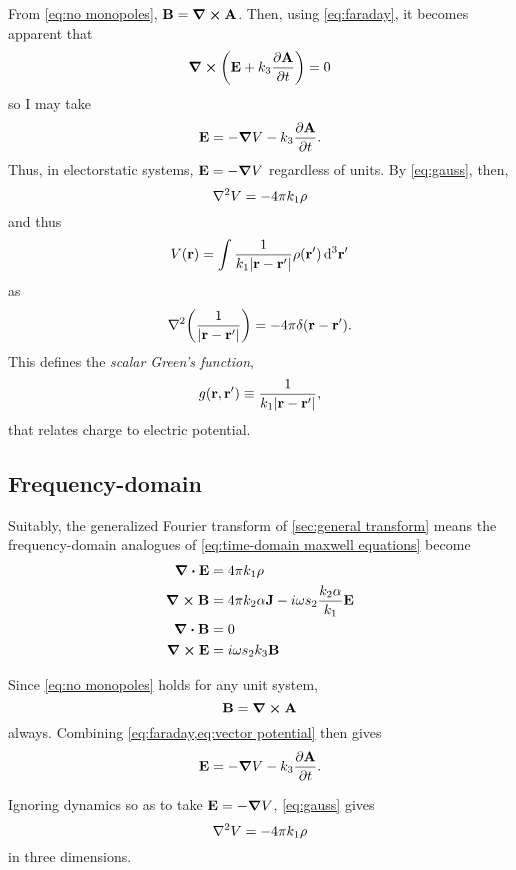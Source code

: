 From \cref{eq:no monopoles}, $\vb{B} = \curl{\vb{A}}$. 
Then, using \cref{eq:faraday}, it becomes apparent that
\begin{equation*}
  \curl{\qty(\vb{E} + k_3 \pdv{\vb{A}}{t})} = 0
\end{equation*}
so I may take
\begin{equation*}
  \vb{E} = -\grad{V} - k_3 \pdv{\vb{A}}{t}.
\end{equation*}
Thus, in electorstatic systems, $\vb{E} = -\grad{V}$ regardless of units.
By \cref{eq:gauss}, then,
\begin{equation*}
  \laplacian V = -4 \pi k_1 \rho
\end{equation*}
and thus
\begin{equation*}
  V(\vb{r}) = \int \frac{1}{k_1 \abs{\vb{r} - \vb{r}'}} \rho(\vb{r}') \dd[3]{\vb{r}'}
\end{equation*}
as
\begin{equation*}
  \laplacian \qty(\frac{1}{\abs{\vb{r} - \vb{r}'}}) = -4 \pi \delta(\vb{r} - \vb{r}').
\end{equation*}
This defines the \emph{scalar Green's function},
\begin{equation}
  g(\vb{r}, \vb{r}') \equiv \frac{1}{k_1 \abs{\vb{r} - \vb{r}'}},
  \label{eq:scalar green}
\end{equation}
that relates charge to electric potential.

\subsection{Frequency-domain}
Suitably, the generalized Fourier transform of \cref{sec:general transform} means the frequency-domain analogues of \cref{eq:time-domain maxwell equations}
become
\begin{subequations}
  \begin{align}
    \div{\vb{E}} &= 4 \pi k_1 \rho \\
    \curl{\vb{B}} &= 4 \pi k_2 \alpha \vb{J} - i \omega s_2 \frac{k_2 \alpha}{k_1} \vb{E} \\
    \div{\vb{B}} &= 0 \\
    \curl{\vb{E}} &= i \omega s_2 k_3 \vb{B}
  \end{align}
  \label{eq:frequency-domain maxwell equations}
\end{subequations}

Since \cref{eq:no monopoles} holds for any unit system,
\begin{equation}
  \vb{B} = \curl{\vb{A}}
  \label{eq:vector potential}
\end{equation}
always.
Combining \cref{eq:faraday,eq:vector potential} then gives
\begin{equation}
  \vb{E} = -\grad{V} - k_3 \pdv{\vb{A}}{t}.
\end{equation}

Ignoring dynamics so as to take $\vb{E} = -\grad{V}$, \cref{eq:gauss} gives
\begin{equation}
  \laplacian V = -4 \pi k_1 \rho
\end{equation}
in three dimensions.


